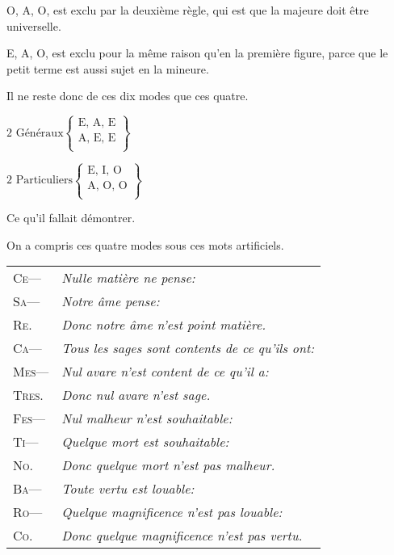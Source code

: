 O, A, O, est exclu par la deuxième règle, qui est que la majeure doit être universelle.

E, A, O, est exclu pour la même raison qu'en la première figure, parce que le petit terme est aussi sujet en la mineure.

Il ne reste donc de ces dix modes que ces quatre.


\begin{center}
$ \text {2 Généraux} \left \{
    \begin{array}{cl}
  	\text{E, A, E} \\
  	\text{A, E, E} \\
    \end{array}
	    \right \} $
\end{center}
\begin{center}
$ \text {2 Particuliers} \left \{
    \begin{array}{cl}
	\text{E, I, O} \\
	\text{A, O, O} \\
    \end{array}
	    \right \} $
\end{center}

Ce qu'il fallait démontrer.

On a compris ces quatre modes sous ces mots artificiels.

\begin{center}
	\begin{tabularx}{\textwidth}{lX}
		{\large\scshape Ce—} & \emph{Nulle matière ne pense:} \\
		{\large\scshape Sa— } & \emph{Notre âme pense:}                           \\
		{\large\scshape Re. } & \emph{Donc notre âme n'est point matière.}        \\
		{\large\scshape Ca— } & \emph{Tous les sages sont contents de ce qu'ils ont:} \\
		{\large\scshape Mes—} &  \emph{Nul avare n'est content de ce qu'il a:}    \\
		{\large\scshape Tres.} & \emph{Donc nul avare n'est sage.}               \\
		{\large\scshape Fes—} & \emph{Nul malheur n'est souhaitable:}            \\
		{\large\scshape Ti— } & \emph{Quelque mort est souhaitable:}              \\
		{\large\scshape No. } & \emph{Donc quelque mort n'est pas malheur.}       \\
		{\large\scshape Ba— } & \emph{Toute vertu est louable:}                   \\
		{\large\scshape Ro— } & \emph{Quelque magnificence n'est pas louable:}    \\
		{\large\scshape Co. } & \emph{Donc quelque magnificence n'est pas vertu.} \\
	\end{tabularx}
\end{center}

